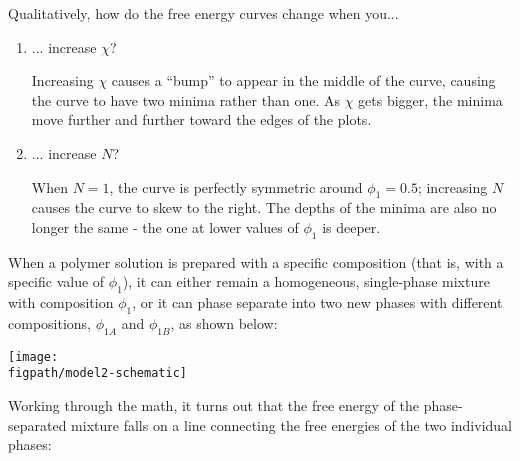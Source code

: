 \begin{activity}
\begin{ctqs}
\begin{solution}[1.5in]
		\end{solution}
	
	\question Qualitatively, how do the free energy curves change when you...
		\begin{enumerate}
			\item ... increase $\chi$?
	
				\begin{solution}[1in]
				
					Increasing $\chi$ causes a ``bump'' to appear in the middle of the curve, causing the curve to have two minima rather than one.  As $\chi$ gets bigger, the minima move further and further toward the edges of the plots.
				
				\end{solution}
				
			\item ... increase $N$?
	
				\begin{solution}[1in]
			
					When $N=1$, the curve is perfectly symmetric around $\phi_1=0.5$; increasing $N$ causes the curve to skew to the right.  The depths of the minima are also no longer the same - the one at lower values of $\phi_1$ is deeper.
				
				\end{solution}
		
		\end{enumerate}
		
\end{ctqs}



\begin{model}

	When a polymer solution is prepared with a specific composition (that is, with a specific value of $\phi_1$), it can either remain a homogeneous, single-phase mixture with composition $\phi_1$, or it can phase separate into two new phases with different compositions, $\phi_{1A}$ and $\phi_{1B}$, as shown below:
	
		\centerline{\texttt{[image: \\figpath/model2-schematic]}}
	
	
	Working through the math, it turns out that the free energy of the phase-separated mixture falls on a line connecting the free energies of the two individual phases:
	

\end{model}
\end{activity}
